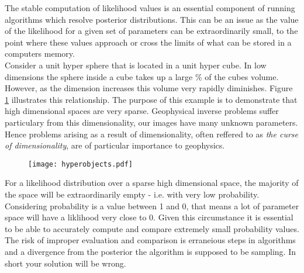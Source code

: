 \begin{tcolorbox}[enhanced jigsaw,breakable,pad at break*=1mm,title=Technical figure 3: Stable computation of likelihood values, title filled,fonttitle=\sffamily\bfseries,fontupper=\sffamily\scriptsize]
\label{tf3}

\begin{multicols}{2}

The stable computation of likelihood values is an essential component of running algorithms which resolve posterior distributions. This can be an issue as the value of the likelihood for a given set of parameters can be extraordinarily small, to the point where these values approach or cross the limits of what can be stored in a computers memory. \\

Consider a unit hyper sphere that is located in a unit hyper cube. In low dimensions the sphere inside a cube takes up a large \% of the cubes volume. However, as the dimension increases this volume very rapidly diminishes. Figure \ref{hyper-objects} illustrates this relationship. The purpose of this example is to demonstrate that high dimensional spaces are very sparse. Geophysical inverse problems suffer particulary from this dimensionality, our images have many unknown parameters. Hence problems arising as a result of dimensionality, often reffered to as \textit{the curse of dimensionality}, are of particular importance to geophysics. \\

\begin{figure}[H]
	\centering
	\texttt{[image: hyperobjects.pdf]}
	\label{hyper-objects}
\end{figure}

For a likelihood distribution over a sparse high dimensional space, the majority of the space will be extraordinarily empty - i.e. with very low probability. Considering probability is a value between 1 and 0, that means a lot of parameter space will have a liklihood very close to 0. Given this circumstance it is essential to be able to accurately compute and compare extremely small probability values. The risk of improper evaluation and comparison is erraneious steps in algorithms and a divergence from the posterior the algorithm is supposed to be sampling. In short your solution will be wrong. \\


\end{multicols}
\end{tcolorbox}
